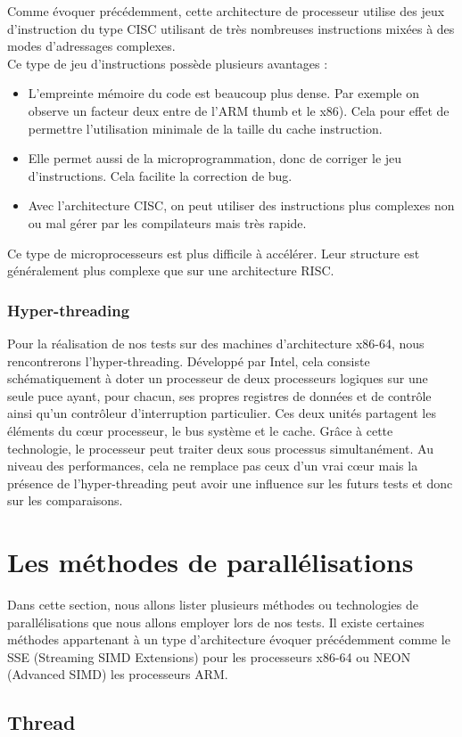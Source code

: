 Comme évoquer précédemment, cette architecture de processeur utilise des jeux d'instruction du type CISC utilisant de très nombreuses instructions mixées à des modes d'adressages complexes. \\
Ce type de jeu d'instructions possède plusieurs avantages :
\begin{itemize}
	\item L'empreinte mémoire du code est beaucoup plus dense. Par exemple on observe un facteur deux entre de l'ARM thumb et le x86). Cela pour effet de permettre l'utilisation minimale de la taille du cache instruction.
	\item Elle permet aussi de la microprogrammation, donc de corriger le jeu d'instructions. Cela facilite la correction de bug.
	\item Avec l'architecture CISC, on peut utiliser des instructions plus complexes non ou mal gérer par les compilateurs mais très rapide.
\end{itemize}
Ce type de microprocesseurs est plus difficile à accélérer. Leur structure est généralement plus complexe que sur une architecture RISC.

\subsubsection{ Hyper-threading }

Pour la réalisation de nos tests sur des machines d'architecture x86-64, 
nous rencontrerons l'hyper-threading. Développé par Intel, cela consiste schématiquement à doter un processeur de deux processeurs logiques sur une seule puce ayant, pour chacun, ses propres registres de données et de contrôle ainsi qu'un contrôleur d'interruption particulier. Ces deux unités partagent les éléments du cœur processeur, le bus système et le cache. Grâce à cette technologie, le processeur peut traiter deux sous processus simultanément. Au niveau des performances, cela ne remplace pas ceux d'un vrai cœur mais la présence de l'hyper-threading peut avoir une influence sur les futurs tests et donc sur les comparaisons. 

\section{ Les méthodes de parallélisations }

Dans cette section, nous allons lister plusieurs méthodes ou technologies de parallélisations que nous allons employer lors de nos tests. Il existe certaines méthodes appartenant à un type d'architecture évoquer précédemment comme le SSE (Streaming SIMD Extensions) pour les processeurs x86-64 ou NEON (Advanced SIMD) les processeurs ARM.

\subsection{ Thread }


 




 



